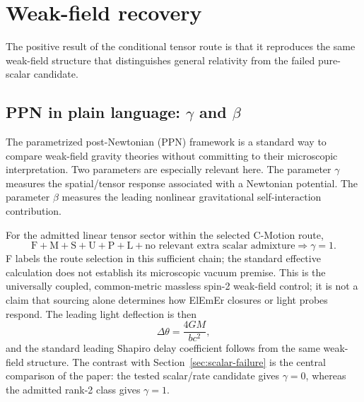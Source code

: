 \documentclass[11pt]{article}
\newcommand{\ElEmEr}{\mbox{ElEmEr}}
\newcommand{\cmc}{c}
\theoremstyle{plain}
\theoremstyle{remark}
\begin{document}
\section{Weak-field recovery}
\label{sec:weakfield}

The positive result of the conditional tensor route is that it reproduces the same
weak-field structure that distinguishes general relativity from the failed pure-scalar
candidate.

\subsection{PPN in plain language: \texorpdfstring{$\gamma$ and $\beta$}{gamma and beta}}

The parametrized post-Newtonian (PPN) framework is a standard way to compare weak-field
gravity theories without committing to their microscopic interpretation.  Two parameters
are especially relevant here.  The parameter $\gamma$ measures the spatial/tensor
response associated with a Newtonian potential.  The parameter $\beta$ measures the
leading nonlinear gravitational self-interaction contribution.

For the admitted linear tensor sector within the selected C-Motion route,
\begin{equation}
\boxed{
\mathrm F+\mathrm M+\mathrm S+\mathrm U+\mathrm P+\mathrm L
+\text{no relevant extra scalar admixture}
\Longrightarrow \gamma=1.}
\label{eq:gamma1}
\end{equation}
F labels the route selection in this sufficient chain; the standard
effective calculation does not establish its microscopic vacuum premise.
This is the universally coupled, common-metric massless spin-2
weak-field control; it is not a claim that sourcing alone determines how
\ElEmEr{} closures or light probes respond.  The leading light deflection is then
\begin{equation}
\boxed{
\Delta\theta=\frac{4GM}{b\cmc^2},}
\label{eq:full-bending}
\end{equation}
and the standard leading Shapiro delay coefficient follows from the same weak-field
structure.  The contrast with Section~\ref{sec:scalar-failure} is the central comparison
of the paper: the tested scalar/rate candidate gives $\gamma=0$, whereas the admitted
rank-2 class gives $\gamma=1$.
\end{document}
